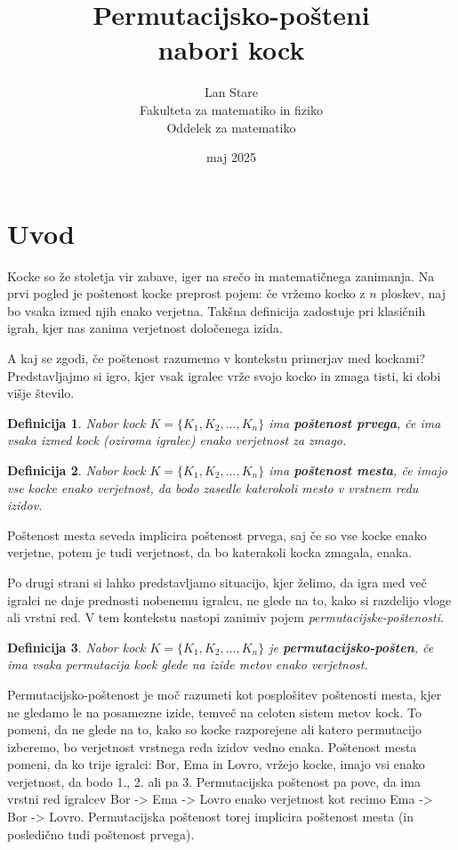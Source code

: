 \documentclass[a4paper, 12pt]{article}
\title{Permutacijsko-pošteni\\ nabori kock}
\author{Lan Stare\\
Fakulteta za matematiko in fiziko \\
Oddelek za matematiko}
\date{maj 2025}
\newtheorem{definicija}{Definicija}
\begin{document}
\maketitle

\section{Uvod}

Kocke so že stoletja vir zabave, iger na srečo in matematičnega zanimanja. Na prvi pogled je poštenost kocke preprost pojem: če vržemo kocko z $n$ ploskev, naj bo vsaka izmed njih enako verjetna. Takšna definicija zadostuje pri klasičnih igrah, kjer nas zanima verjetnost določenega izida.

A kaj se zgodi, če poštenost razumemo v kontekstu primerjav med kockami? Predstavljajmo si igro, kjer vsak igralec vrže svojo kocko in zmaga tisti, ki dobi višje število.

\begin{definicija}
  Nabor kock $K = \{K_1, K_2, \ldots, K_n\}$ ima \textbf{poštenost prvega}, če ima vsaka izmed kock (oziroma igralec) enako verjetnost za zmago.
\end{definicija}

\begin{definicija}
  Nabor kock $K = \{K_1, K_2, \ldots, K_n\}$ ima \textbf{poštenost mesta}, če imajo vse kocke enako verjetnost, da bodo zasedle katerokoli mesto v vrstnem redu izidov.
\end{definicija}

Poštenost mesta seveda implicira poštenost prvega, saj če so vse kocke enako verjetne, potem je tudi verjetnost, da bo katerakoli kocka zmagala, enaka.

Po drugi strani si lahko predstavljamo situacijo, kjer želimo, da igra med več igralci ne daje prednosti nobenemu igralcu, ne glede na to, kako si razdelijo vloge ali vrstni red. V tem kontekstu nastopi zanimiv pojem {\em permutacijske-poštenosti}.

\begin{definicija}
  Nabor kock $K = \{K_1, K_2, \ldots, K_n\}$ je \textbf{permutacijsko-pošten}, če ima vsaka permutacija kock glede na izide metov enako verjetnost.
\end{definicija}

Permutacijsko-poštenost je moč razumeti kot posplošitev poštenosti mesta, kjer ne gledamo le na posamezne izide, temveč na celoten sistem metov kock. To pomeni, da ne glede na to, kako so kocke razporejene ali katero permutacijo izberemo, bo verjetnost vrstnega reda izidov vedno enaka. Poštenost mesta pomeni, da ko trije igralci: Bor, Ema in Lovro, vržejo kocke, imajo vsi enako verjetnost, da bodo 1., 2. ali pa 3. Permutacijska poštenost pa pove, da ima vrstni red igralcev Bor -> Ema -> Lovro enako verjetnost kot recimo Ema -> Bor -> Lovro. Permutacijska poštenost torej implicira poštenost mesta (in posledično tudi poštenost prvega).
\end{document}
